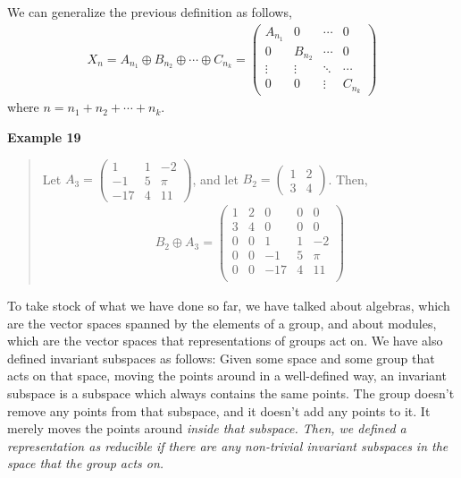 \documentclass[12pt,epsf]{article}
\def\nolabel{\nonumber }
\def\nolabel{\nonumber }
\begin{document}
We can generalize the previous definition as follows, 
\begin{eqnarray}
X_n = A_{n_1}\oplus B_{n_2} \oplus \cdots \oplus C_{n_k} = 
\begin{pmatrix}
A_{n_1} & 0 & \cdots & 0 \\
0 & B_{n_2} & \cdots & 0 \\
\vdots & \vdots & \ddots & \cdots \\
0 & 0 & \vdots & C_{n_k} 
\end{pmatrix}\nolabel 
\end{eqnarray}
where $n=n_1+n_2+\cdots + n_k$.  

\bf Example 19 \rm
\vspace*{-2ex}
\begin{quote}
Let $A_3 = 
\begin{pmatrix}
1 & 1 & -2 \\ -1 & 5 & \pi \\ -17 & 4 & 11
\end{pmatrix}$, and let $B_2 = 
\begin{pmatrix}
1 & 2 \\ 3 & 4
\end{pmatrix}$.  Then, 
\begin{eqnarray}
B_2 \oplus A_3 = 
\begin{pmatrix}
1 & 2 & 0 & 0 & 0 \\
3 & 4 & 0 & 0 & 0 \\
0 & 0 & 1 & 1 & -2 \\
0 & 0 & -1 & 5 & \pi \\
0 & 0 & -17 & 4 & 11 \\
\end{pmatrix}\nolabel 
\end{eqnarray}
\end{quote}

To take stock of what we have done so far, we have talked about
algebras, which are the vector spaces spanned by the elements of a
group, and about modules, which are the vector spaces that representations
of groups act on.  We have also defined invariant subspaces as
follows:  Given some space and some group that acts on that space, moving the 
points around in a well-defined way, an invariant subspace is a subspace which 
always contains the same points.  The group doesn't remove any points from that
subspace, and it doesn't add any points to it.  It merely moves the points around
\it inside \rm that subspace.  
Then, we defined a representation as reducible if there are any
non-trivial invariant subspaces in the space that the group acts on.  
\end{document}
